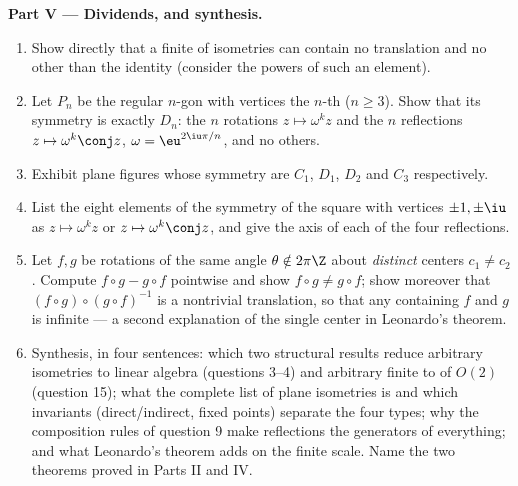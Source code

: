 \begin{problem}
\medskip
\noindent\textbf{Part V --- Dividends, and synthesis.}
\begin{enumerate}[resume]
  \item Show directly that a finite  of isometries can
        contain no translation and no  other
        than the identity (consider the powers of such an
        element).
  \item Let $P_n$ be the regular $n$-gon with vertices the
        $n$-th  ($n \geq 3$). Show that its
        symmetry  is exactly $D_n$: the $n$ rotations $z
        \mapsto \omega^k z$ and the $n$ reflections $z \mapsto
        \omega^k \conj z$, $\omega = \eu^{2\iu\pi/n}$, and no
        others.
  \item Exhibit plane figures whose symmetry  are $C_1$,
        $D_1$, $D_2$ and $C_3$ respectively.
  \item List the eight elements of the symmetry  of the
        square with vertices $\pm1, \pm\iu$ as  $z \mapsto
        \omega^k z$ or $z \mapsto \omega^k\conj z$, and give
        the axis of each of the four reflections.
  \item Let $f, g$ be rotations of the same angle $\theta
        \notin 2\pi\Z$ about \emph{distinct} centers $c_1 \neq
        c_2$. Compute $f\circ g - g\circ f$ pointwise and show
        $f\circ g \neq g\circ f$; show moreover that $(f \circ
        g)\circ(g\circ f)^{-1}$ is a nontrivial translation, so
        that any  containing $f$ and $g$ is infinite ---
        a second explanation of the single center in Leonardo's
        theorem.
  \item Synthesis, in four sentences: which two structural
        results reduce arbitrary isometries to linear algebra
        (questions 3--4) and arbitrary finite  to
         of $O(2)$ (question 15); what the complete
        list of plane isometries is and which invariants
        (direct/indirect, fixed points) separate the four types;
        why the composition rules of question 9 make reflections
        the generators of everything; and what Leonardo's
        theorem adds on the finite scale. Name the two theorems
        proved in Parts II and IV.
\end{enumerate}
\end{problem}
